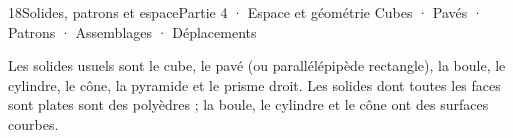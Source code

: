 \begin{ouverture}[espace]{18}{Solides, patrons et espace}{Partie 4 · Espace et géométrie}
{Cubes · Pavés · Patrons · Assemblages · Déplacements}
\end{ouverture}
\pagestyle{otMain}\essentiel\fontsize{11}{15}\selectfont
{}\label{cours-18-1}
\begin{definition}Les solides usuels sont le cube, le pavé (ou parallélépipède rectangle), la boule, le cylindre, le cône, la pyramide et le prisme droit. Les solides dont toutes les faces sont plates sont des polyèdres ; la boule, le cylindre et le cône ont des surfaces courbes.\end{definition}
\label{fig-cours-18-1-cours-solides}


